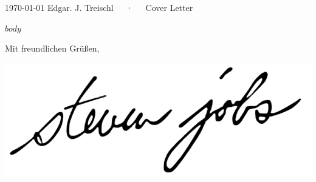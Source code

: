 \documentclass[14pt, a4paper]{awesome-cv}
\begin{document}
\makecvheader[R]

\makecvfooter
  {\today}
  {Edgar. J. Treischl~~~·~~~Cover Letter}
  {}

\makelettertitle



$body$



Mit freundlichen Grüßen,

\includegraphics[scale=0.1]{sign.png}
\end{document}
